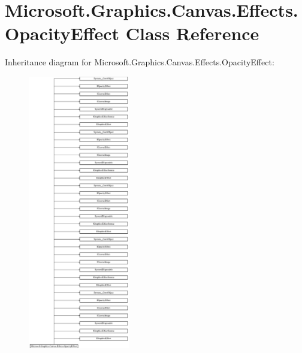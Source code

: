 \hypertarget{class_microsoft_1_1_graphics_1_1_canvas_1_1_effects_1_1_opacity_effect}{}\section{Microsoft.\+Graphics.\+Canvas.\+Effects.\+Opacity\+Effect Class Reference}
\label{class_microsoft_1_1_graphics_1_1_canvas_1_1_effects_1_1_opacity_effect}
Inheritance diagram for Microsoft.\+Graphics.\+Canvas.\+Effects.\+Opacity\+Effect\+:\begin{figure}[H]
\begin{center}
\leavevmode
\includegraphics[height=12.000000cm]{class_microsoft_1_1_graphics_1_1_canvas_1_1_effects_1_1_opacity_effect}
\end{center}
\end{figure}
